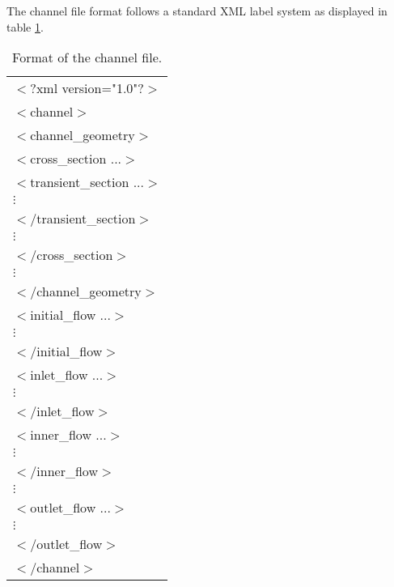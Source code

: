 \documentclass[a4paper,12pt]{article}
\newcommand{\TABLE}[4]
{
	\begin{table}[ht!]\centering
	\begin{tabular}{#1}\hline#2\\\hline\end{tabular}
	\caption{#3.\label{#4}}\end{table}
}
\begin{document}
The channel file format follows a standard XML label system as displayed in table \ref{TabCauce}.
\TABLE{l}
{
$<$?xml version="1.0"?$>$\\
$<$channel$>$\\
\hspace{2cm}$<$channel\_geometry$>$\\
	\hspace{4cm}$<$cross\_section ...$>$\\
		\hspace{6cm}$<$transient\_section ...$>$\\
			\hspace{7cm}$\vdots$\\
		\hspace{6cm}$<$/transient\_section$>$\\
		\hspace{6cm}$\vdots$\\
	\hspace{4cm}$<$/cross\_section$>$\\
	\hspace{4cm}$\vdots$\\
\hspace{2cm}$<$/channel\_geometry$>$\\
\hspace{2cm}$<$initial\_flow ...$>$\\
	\hspace{3cm}$\vdots$\\
\hspace{2cm}$<$/initial\_flow$>$\\
\hspace{2cm}$<$inlet\_flow ...$>$\\
	\hspace{3cm}$\vdots$\\
\hspace{2cm}$<$/inlet\_flow$>$\\
\hspace{2cm}$<$inner\_flow ...$>$\\
	\hspace{3cm}$\vdots$\\
\hspace{2cm}$<$/inner\_flow$>$\\
\hspace{2cm}$\vdots$\\
\hspace{2cm}$<$outlet\_flow ...$>$\\
	\hspace{3cm}$\vdots$\\
\hspace{2cm}$<$/outlet\_flow$>$\\
$<$/channel$>$
}{Format of the channel file}{TabCauce}
\end{document}
